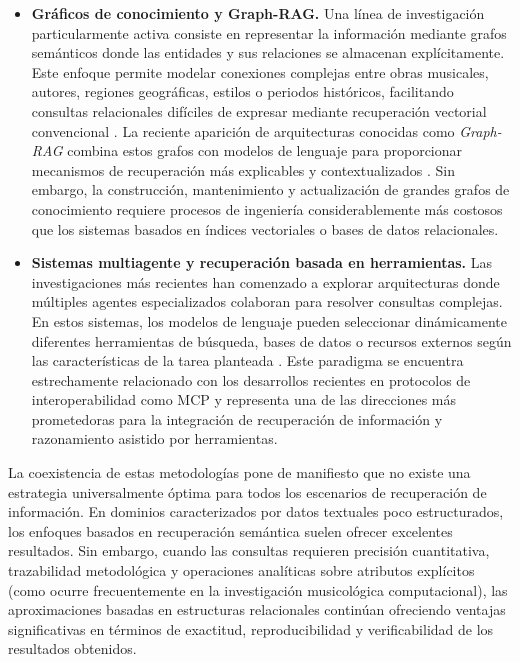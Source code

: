 \begin{itemize}
    \item \textbf{Gráficos de conocimiento y Graph-RAG.} Una línea de investigación particularmente activa consiste en representar la información mediante grafos semánticos donde las entidades y sus relaciones se almacenan explícitamente. Este enfoque permite modelar conexiones complejas entre obras musicales, autores, regiones geográficas, estilos o periodos históricos, facilitando consultas relacionales difíciles de expresar mediante recuperación vectorial convencional \citep{hogan2021knowledge}. La reciente aparición de arquitecturas conocidas como \textit{Graph-RAG} combina estos grafos con modelos de lenguaje para proporcionar mecanismos de recuperación más explicables y contextualizados \citep{edge2024from}. Sin embargo, la construcción, mantenimiento y actualización de grandes grafos de conocimiento requiere procesos de ingeniería considerablemente más costosos que los sistemas basados en índices vectoriales o bases de datos relacionales.
    \item \textbf{Sistemas multiagente y recuperación basada en herramientas.} Las investigaciones más recientes han comenzado a explorar arquitecturas donde múltiples agentes especializados colaboran para resolver consultas complejas. En estos sistemas, los modelos de lenguaje pueden seleccionar dinámicamente diferentes herramientas de búsqueda, bases de datos o recursos externos según las características de la tarea planteada \citep{yao2023react, wang2024surveyagents}. Este paradigma se encuentra estrechamente relacionado con los desarrollos recientes en protocolos de interoperabilidad como MCP y representa una de las direcciones más prometedoras para la integración de recuperación de información y razonamiento asistido por herramientas.
\end{itemize}

La coexistencia de estas metodologías pone de manifiesto que no existe una estrategia universalmente óptima para todos los escenarios de recuperación de información. En dominios caracterizados por datos textuales poco estructurados, los enfoques basados en recuperación semántica suelen ofrecer excelentes resultados. Sin embargo, cuando las consultas requieren precisión cuantitativa, trazabilidad metodológica y operaciones analíticas sobre atributos explícitos (como ocurre frecuentemente en la investigación musicológica computacional), las aproximaciones basadas en estructuras relacionales continúan ofreciendo ventajas significativas en términos de exactitud, reproducibilidad y verificabilidad de los resultados obtenidos.